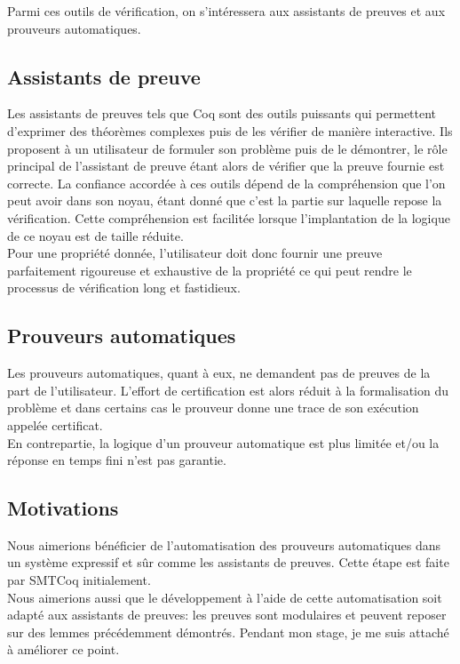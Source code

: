 \documentclass{article}
\begin{document}
Parmi ces outils de vérification, on s'intéressera aux assistants de preuves et aux prouveurs automatiques. 

\subsection{Assistants de preuve}

Les assistants de preuves tels que Coq sont des outils puissants qui permettent d'exprimer des théorèmes complexes puis de les vérifier de manière interactive. Ils proposent à un utilisateur de formuler son problème puis de le démontrer, le rôle principal de l'assistant de preuve étant alors de vérifier que la preuve fournie est correcte.  La confiance accordée à ces outils dépend de la compréhension que l'on peut avoir dans son noyau, étant donné que c'est la partie sur laquelle repose la vérification. Cette compréhension est facilitée lorsque l'implantation de la logique de ce noyau est de taille réduite. \\

Pour une propriété donnée, l'utilisateur doit donc fournir une preuve parfaitement rigoureuse et exhaustive de la propriété ce qui peut rendre le processus de vérification long et fastidieux.



\subsection{Prouveurs automatiques}

Les prouveurs automatiques, quant à eux, ne demandent pas de preuves de la part de l'utilisateur. L'effort de certification est alors réduit à la formalisation du problème et dans certains cas le prouveur donne une trace de son exécution appelée certificat. \\

En contrepartie, la logique d'un prouveur automatique est plus limitée et/ou la réponse en temps fini n'est pas garantie.

\subsection{Motivations}

Nous aimerions bénéficier de l'automatisation des prouveurs automatiques dans un système expressif et sûr comme les assistants de preuves. Cette étape est faite par SMTCoq initialement. \\

Nous aimerions aussi que le développement à l'aide de cette automatisation soit adapté aux assistants de preuves: les preuves sont modulaires et peuvent reposer sur des lemmes précédemment démontrés. Pendant mon stage, je me suis attaché à améliorer ce point.
\end{document}
